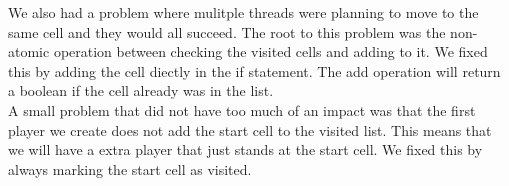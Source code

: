\documentclass[11pt]{article}
\begin{document}
\noindent
We also had a problem where mulitple threads were planning to move to the same cell and they would all succeed.
The root to this problem was the non-atomic operation between checking the visited cells and adding to it.
We fixed this by adding the cell diectly in the if statement. The add operation will return a boolean if the cell
already was in the list.\\

\noindent
A small problem that did not have too much of an impact was that the first player we create does not add the start cell
to the visited list. This means that we will have a extra player that just stands at the start cell.
We fixed this by always marking the start cell as visited.
\end{document}

